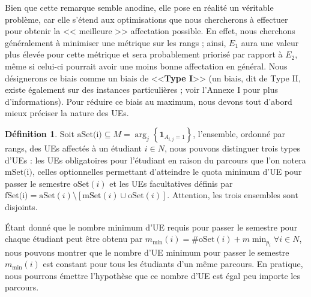 \documentclass{rapport}
\theoremstyle{definition}
\newtheorem{definition}{Définition}
\theoremstyle{remark}
\theoremstyle{plain}
\theoremstyle{definition}
\theoremstyle{definition}
\theoremstyle{remark}
\theoremstyle{definition}
\begin{document}
Bien que cette remarque semble anodine, elle pose en réalité un véritable problème, car elle s'étend aux optimisations que nous chercherons à effectuer pour obtenir la << meilleure >> affectation possible.
En effet, nous cherchons généralement à minimiser une métrique sur les rangs ; ainsi, $E_1$ aura une valeur plus élevée pour cette métrique et sera probablement priorisé par rapport à $E_2$, même si celui-ci pourrait avoir une moins bonne affectation en général.
Nous désignerons ce biais comme un biais de <<\textbf{Type I}>> (un biais, dit de Type II, existe également sur des instances particulières ; voir l'Annexe I pour plus d'informations).
Pour réduire ce biais au maximum, nous devons tout d'abord mieux préciser la nature des UEs.

\begin{definition}
    Soit $\text{aSet(i)}\subseteq M=\arg_j\left\{\mathbf{1}_{A_{i,j}=1}\right\}$, l'ensemble, ordonné par rangs, des UEs affectés à un étudiant $i\in N$, nous pouvons distinguer trois types d'UEs :
    les UEs obligatoires pour l'étudiant en raison du parcours que l'on notera $\text{mSet(i)}$,
    celles optionnelles permettant d'atteindre le quota minimum d'UE pour passer le semestre $\text{oSet}(i)$
    et les UEs facultatives définis par $\text{fSet(i)} = \text{aSet}(i)\setminus[\text{mSet}(i)\cup\text{oSet}(i)]$.
    Attention, les trois ensembles sont disjoints.
\end{definition}
Étant donné que le nombre minimum d'UE requis pour passer le semestre pour chaque étudiant peut être obtenu par $m_{\min}(i)=\#\text{oSet}(i)+m\!\min_{p_i} \forall i \in N$,
nous pouvons montrer que le nombre d'UE minimum pour passer le semestre $m_{\min}(i)$ est constant pour tous les étudiants d'un même parcours. En pratique, nous pourrons émettre l'hypothèse que ce nombre d'UE
est égal peu importe les parcours.
\end{document}
